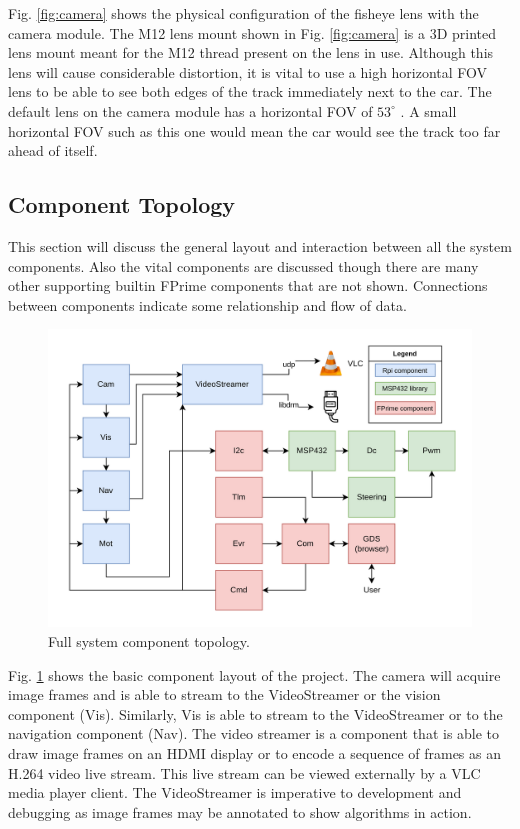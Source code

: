 \documentclass{article}
\begin{document}
Fig. \ref{fig:camera} shows the physical configuration of the fisheye lens
with the camera module. The M12 lens mount shown in Fig. \ref{fig:camera} is a
3D printed lens mount meant for the M12 thread present on the lens in use.
Although this lens will cause considerable distortion, it is vital to use a
high horizontal FOV lens to be able to see both edges of the track immediately
next to the car. The default lens on the camera module has a horizontal
FOV of $53^{\circ}$ \cite{b6}. A small horizontal FOV such as this one would mean
the car would see the track too far ahead of itself.

\subsection{Component Topology}

This section will discuss the general layout and interaction between all the system
components. Also the vital components are discussed though there are many other
supporting builtin FPrime components that are not shown. Connections between components
indicate some relationship and flow of data.

\begin{figure}[htb]
	\centering
	\centerline{\includegraphics[width=1.0\linewidth]{block}}
	\caption{Full system component topology.}
	\label{fig:block}
\end{figure}

Fig. \ref{fig:block} shows the basic component layout of the project. The camera
will acquire image frames and is able to stream to the VideoStreamer or the
vision component (Vis). Similarly, Vis is able to stream to the VideoStreamer or
to the navigation component (Nav). The video streamer is a component that is able to
draw image frames on an HDMI display or to encode a sequence of frames as an H.264
video live stream. This live stream can be viewed externally by a VLC media player
client. The VideoStreamer is imperative to development and debugging as image frames
may be annotated to show algorithms in action.
\end{document}
